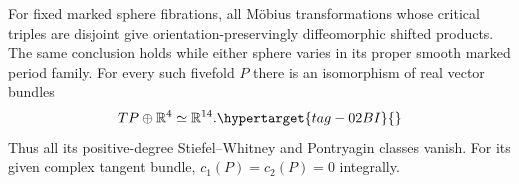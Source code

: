 \begin{proposition}\hypertarget{tag-02MR}{}\label{maps:src:E.2.7}


For fixed marked sphere fibrations, all M\"obius transformations
whose critical triples are disjoint give orientation-preservingly
diffeomorphic shifted products. The same conclusion holds while
either sphere varies in its proper smooth marked period family.
For every such fivefold $P$ there is an isomorphism of real vector
bundles
\begin{equation}
 TP\oplus\mathbb R^4\simeq\mathbb R^{14}.
 \hypertarget{tag-02BI}{}\label{maps:eq:E.MV9}
\end{equation}
Thus all its positive-degree Stiefel--Whitney and Pontryagin
classes vanish. For its given complex tangent bundle,
$c_1(P)=c_2(P)=0$ integrally.
\end{proposition}



